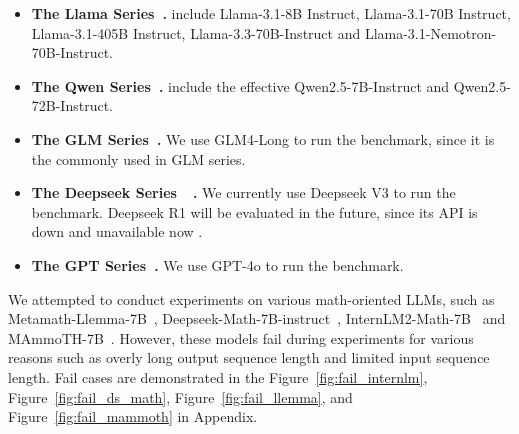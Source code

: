 \begin{itemize}[leftmargin=*]
	\item \textbf{The Llama Series~\citep{grattafiori2024llama3herdmodels}.} include Llama-3.1-8B Instruct, Llama-3.1-70B Instruct, Llama-3.1-405B Instruct, 
	Llama-3.3-70B-Instruct and Llama-3.1-Nemotron-70B-Instruct.
	\item \textbf{The Qwen Series~\citep{qwen2025qwen25technicalreport}.} include the effective Qwen2.5-7B-Instruct and Qwen2.5-72B-Instruct. 
	\item \textbf{The GLM Series~\citep{glm2024chatglm}.} We use GLM4-Long to run the benchmark, since it is the commonly used in GLM series.
	
	\item \textbf{The Deepseek Series~\citep{liu2024deepseek}~\citep{deepseekai2025deepseekr1incentivizingreasoningcapability}.} We currently use Deepseek V3 to run the benchmark. 
	Deepseek R1 will be evaluated in the future, since its API is down and unavailable now . 
	\item  \textbf{The GPT Series~\cite{achiam2023gpt}.} We use GPT-4o to run the benchmark. 
\end{itemize}

 
	We attempted to conduct experiments   on various math-oriented LLMs, such as Metamath-Llemma-7B~\citep{yu2023metamath}, Deepseek-Math-7B-instruct~\citep{deepseek-math}, InternLM2-Math-7B~\citep{ying2024internlmmathopenmathlarge} and MAmmoTH-7B~\citep{yue2023mammoth}.
	 However, these models fail during experiments for various reasons such as overly long output sequence length and limited input sequence length. Fail cases are demonstrated in the Figure~\ref{fig:fail_internlm},  Figure~\ref{fig:fail_ds_math},  Figure~\ref{fig:fail_llemma}, and  Figure~\ref{fig:fail_mammoth} in Appendix. 




